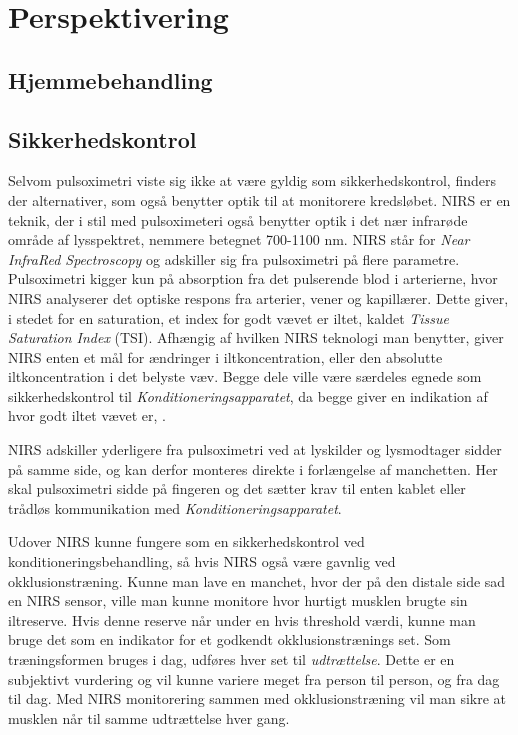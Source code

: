 \chapter{Perspektivering} 

\section{Hjemmebehandling}\label{title:Hjemmebehandling}



\section{Sikkerhedskontrol}\label{title:nirs}
Selvom pulsoximetri viste sig ikke at være gyldig som sikkerhedskontrol, finders der alternativer, som også benytter optik til at monitorere kredsløbet. NIRS er en teknik, der i stil med pulsoximeteri også benytter optik i det nær infrarøde område af lysspektret, nemmere betegnet 700-1100 nm. NIRS står for \textit{Near InfraRed Spectroscopy} og adskiller sig fra pulsoximetri på flere parametre. Pulsoximetri kigger kun på absorption fra det pulserende blod i arterierne, hvor NIRS analyserer det optiske respons fra arterier, vener og kapillærer. Dette giver, i stedet for en saturation, et index for godt vævet er iltet, kaldet \textit{Tissue Saturation Index} (TSI). Afhængig af hvilken NIRS teknologi man benytter, giver NIRS enten et mål for ændringer i iltkoncentration, eller den absolutte iltkoncentration i det belyste væv. Begge dele ville være særdeles egnede som sikkerhedskontrol til \textit{Konditioneringsapparatet}, da begge giver en indikation af hvor godt iltet vævet er, \cite{RefWorks:22} .

NIRS adskiller yderligere fra pulsoximetri ved at lyskilder og lysmodtager sidder på samme side, og kan derfor monteres direkte i forlængelse af manchetten. Her skal pulsoximetri sidde på fingeren og det sætter krav til enten kablet eller trådløs kommunikation med \textit{Konditioneringsapparatet}. 

Udover NIRS kunne fungere som en sikkerhedskontrol ved konditioneringsbehandling, så hvis NIRS også være gavnlig ved okklusionstræning. Kunne man lave en manchet, hvor der på den distale side sad en NIRS sensor, ville man kunne monitore hvor hurtigt musklen brugte sin iltreserve. Hvis denne reserve når under en hvis threshold værdi, kunne man bruge det som en indikator for et godkendt okklusionstrænings set. Som træningsformen bruges i dag, udføres hver set til \textit{udtrættelse}. Dette er en subjektivt vurdering og vil kunne variere meget fra person til person, og fra dag til dag. Med NIRS monitorering sammen med okklusionstræning vil man sikre at musklen når til samme udtrættelse hver gang. 

